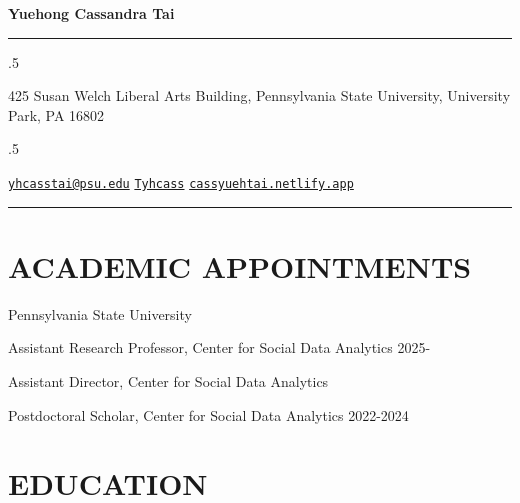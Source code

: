 \documentclass[10.5pt,]{article}
\providecommand{\tightlist}{%
	\setlength{\itemsep}{0pt}\setlength{\parskip}{0pt}}
\renewenvironment{itemize}{
	\begin{list}{}{
			\setlength{\leftmargin}{1.5em}
		}
	}{
	\end{list}
}
\begin{document}
	
	
	\centerline{\huge \bf Yuehong Cassandra Tai}
	
	
	
	\vspace{2 mm}
	
	\hrule
	
	\vspace{2 mm}
	
	
	\moveleft.5\hoffset\centerline{425 Susan Welch Liberal Arts Building,
Pennsylvania State University, University Park, PA 16802}
	\moveleft.5\hoffset\centerline{ {\FA\faEnvelope} \hspace{1 mm} \href{mailto:}{\tt \href{mailto:yhcasstai@psu.edu}{\nolinkurl{yhcasstai@psu.edu}}} \hspace{1 mm}  {\FA\faGithub} \hspace{1 mm} \href{http://github.com/Tyhcass}{\tt Tyhcass} \hspace{1 mm}    {\FA\faGlobe} \hspace{1 mm} \href{http://cassyuehtai.netlify.app}{\tt cassyuehtai.netlify.app}   }
	
	\vspace{2 mm}
	
	\hrule
	
		
	\section{ACADEMIC APPOINTMENTS}\label{academic-appointments}

\begin{itemize}
\tightlist
\item
  Pennsylvania State University

  \begin{itemize}
  \tightlist
  \item
    Assistant Research Professor, Center for Social Data Analytics
    \hfill 2025-
  \item
    Assistant Director, Center for Social Data Analytics
  \item
    Postdoctoral Scholar, Center for Social Data Analytics
    \hfill 2022-2024
  \end{itemize}
\end{itemize}

\section{EDUCATION}\label{education}
\end{document}
